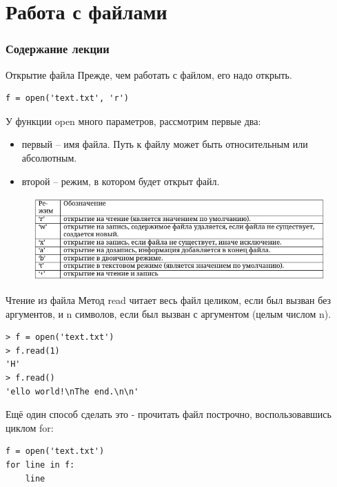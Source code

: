 \documentclass[xcolor=table]{beamer}
\begin{document}
\section{Работа с файлами}

\begin{frame}
  \frametitle{Содержание лекции}
  \tableofcontents[current]
\end{frame}

\begin{frame}[fragile]{Открытие файла}
	Прежде, чем работать с файлом, его надо открыть.
	\begin{verbatim}
f = open('text.txt', 'r')
	\end{verbatim}
	
	У функции open много параметров, рассмотрим первые два:
	\begin{itemize}
		\item первый -- имя файла. Путь к файлу может быть относительным или абсолютным. 
		\item второй -- режим, в котором будет открыт файл.	
	\end{itemize}
	\begin{figure}[h]
		\centering
		\includegraphics[scale=0.5]{images/lec11-pic01.png}
	\end{figure}	
\end{frame}

\begin{frame}[fragile]{Чтение из файла}
	Метод read читает весь файл целиком, если был вызван без аргументов, и n
символов, если был вызван с аргументом (целым числом n).
	\begin{verbatim}
> f = open('text.txt')
> f.read(1)
'H'
> f.read()
'ello world!\nThe end.\n\n'
	\end{verbatim}
	
	Ещё один способ сделать это - прочитать файл построчно, воспользовавшись циклом for:
	\begin{verbatim}
f = open('text.txt')
for line in f:
	line
	\end{verbatim}
\end{frame}
\end{document}

